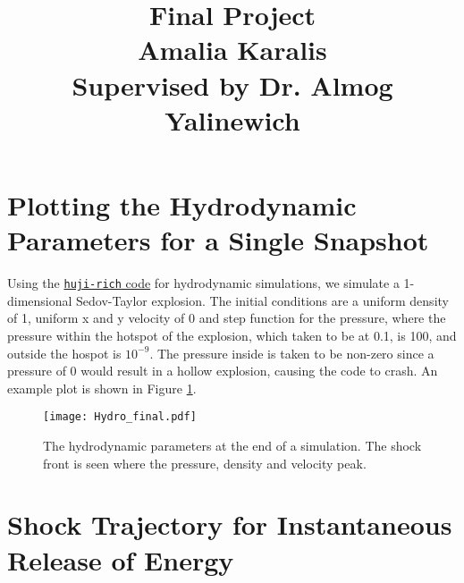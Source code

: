\documentclass{article}
\title {Final Project  \\[1ex] \large Amalia Karalis \\[1ex] \large Supervised by Dr. Almog Yalinewich}
\date{}
\begin{document}
\maketitle
\section{Plotting the Hydrodynamic Parameters for a Single Snapshot}
Using the \href{https://github.com/bolverk/huji-rich/wiki}{\texttt{huji-rich} code} for hydrodynamic simulations, we simulate a 1-dimensional Sedov-Taylor explosion. The initial conditions are a uniform density of 1, uniform x and y velocity of 0 and step function for the pressure, where the pressure within the hotspot of the explosion, which taken to be at 0.1, is 100, and outside the hospot is $10^{-9}$. The pressure inside is taken to be non-zero since a pressure of 0 would result in a hollow explosion, causing the code to crash. An example plot is shown in Figure \ref{fig: Hydro_Final}.

\begin{figure}[ht!]
    \texttt{[image: Hydro\_final.pdf]} 
    \centering
    \caption{The hydrodynamic parameters at the end of a simulation. The shock front is seen where the pressure, density and velocity peak.}
    \label{fig: Hydro_Final}
\end{figure}


\section{Shock Trajectory for Instantaneous Release of Energy}
\end{document}
